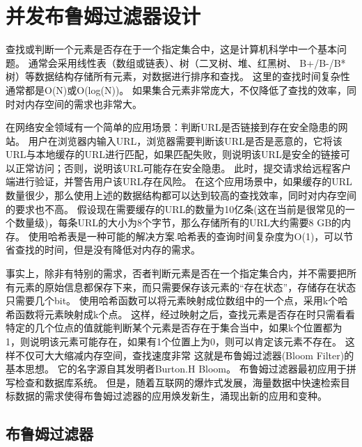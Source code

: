 \chapter{并发布鲁姆过滤器设计}
查找或判断一个元素是否存在于一个指定集合中，这是计算机科学中一个基本问题。
通常会采用线性表（数组或链表）、树（二叉树、堆、红黑树、 B+/B-/B*树）等数据结构存储所有元素，对数据进行排序和查找。
这里的查找时间复杂性通常都是O(N)或O(log(N))。
如果集合元素非常庞大，不仅降低了查找的效率，同时对内存空间的需求也非常大。

在网络安全领域有一个简单的应用场景：判断URL是否链接到存在安全隐患的网站。
用户在浏览器内输入URL，浏览器需要判断该URL是否是恶意的，它将该URL与本地缓存的URL进行匹配，如果匹配失败，则说明该URL是安全的链接可以正常访问；否则，说明该URL可能存在安全隐患。
此时，提交请求给远程客户端进行验证，并警告用户该URL存在风险。
在这个应用场景中，如果缓存的URL数量很少，那么使用上述的数据结构都可以达到较高的查找效率，同时对内存空间的要求也不高。
假设现在需要缓存的URL的数量为10亿条(这在当前是很常见的一个数量级)，每条URL的大小为8个字节，那么存储所有的URL大约需要8 GB的内存。
使用哈希表是一种可能的解决方案.哈希表的查询时间复杂度为O(1)，可以节省查找的时间，但是没有降低对内存的需求。

事实上，除非有特别的需求，否者判断元素是否在一个指定集合内，并不需要把所有元素的原始信息都保存下来，而只需要保存该元素的“存在状态”，存储存在状态只需要几个bit。
使用哈希函数可以将元素映射成位数组中的一个点，采用k个哈希函数将元素映射成k个点。
这样，经过映射之后，查找元素是否存在时只需看看特定的几个位点的值就能判断某个元素是否存在于集合当中，如果k个位置都为1，则说明该元素可能存在，如果有1个位置上为0，则可以肯定该元素不存在。
这样不仅可大大缩减内存空间，查找速度非常
这就是布鲁姆过滤器(Bloom Filter)的基本思想。
它的名字源自其发明者Burton.H Bloom\cite{bloom1970space}。
布鲁姆过滤器最初应用于拼写检查和数据库系统。
但是，随着互联网的爆炸式发展，海量数据中快速检索目标数据的需求使得布鲁姆过滤器的应用焕发新生，涌现出新的应用和变种\cite{bender2012don,bonomi2006improved,song2005fast,yu2009buffalo}。

\section{布鲁姆过滤器}

